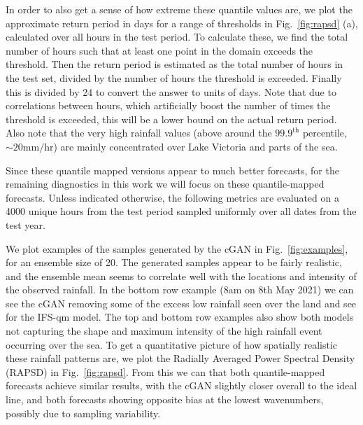 \documentclass[../main.tex]{subfiles}
\begin{document}
In order to also get a sense of how extreme these quantile values are, we plot the approximate return period in days for a range of thresholds in Fig.~\ref{fig:rapsd} (a), calculated over all hours in the test period. To calculate these, we find the total number of hours such that at least one point in the domain exceeds the threshold. Then the return period is estimated as the total number of hours in the test set, divided by the number of hours the threshold is exceeded. Finally this is divided by 24 to convert the answer to units of days. Note that due to correlations between hours, which artificially boost the number of times the threshold is exceeded, this will be a lower bound on the actual return period. Also note that the very high rainfall values (above around the $99.9^{\text{th}}$ percentile, $\sim20\text{mm/hr}$) are mainly concentrated over Lake Victoria and parts of the sea. 

Since these quantile mapped versions appear to much better forecasts, for the remaining diagnostics in this work we will focus on these quantile-mapped forecasts. Unless indicated otherwise, the following metrics are evaluated on a 4000 unique hours from the test period sampled uniformly over all dates from the test year.

We plot examples of the samples generated by the cGAN in Fig.~\ref{fig:examples}, for an ensemble size of 20. The generated samples appear to be fairly realistic, and the ensemble mean seems to correlate well with the locations and intensity of the observed rainfall. In the bottom row example (8am on 8th May 2021) we can see the cGAN removing some of the excess low rainfall seen over the land and see for the IFS-qm model. The top and bottom row examples also show both models not capturing the shape and maximum intensity of the high rainfall event occurring over the sea. To get a quantitative picture of how spatially realistic these rainfall patterns are, we plot the Radially Averaged Power Spectral Density (RAPSD) in Fig.~\ref{fig:rapsd}. From this we can that both quantile-mapped forecasts achieve similar results, with the cGAN slightly closer overall to the ideal line, and both forecasts showing opposite bias at the lowest wavenumbers, possibly due to sampling variability.
\end{document}
